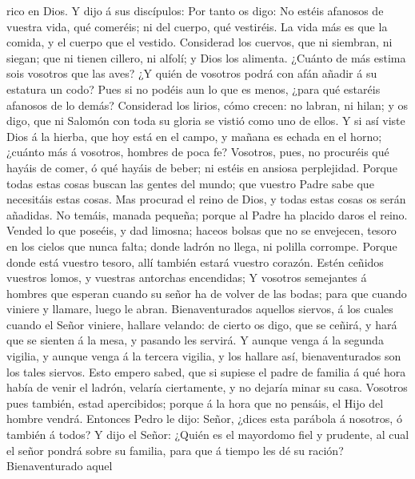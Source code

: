 rico en Dios.  Y dijo á sus discípulos: Por tanto os digo:
No estéis afanosos de vuestra vida, qué comeréis; ni del cuerpo, qué
vestiréis.  La vida más es que la comida, y el cuerpo que
el vestido.  Considerad los cuervos, que ni siembran, ni
siegan; que ni tienen cillero, ni alfolí; y Dios los alimenta. ¿Cuánto
de más estima sois vosotros que las aves?  ¿Y quién de
vosotros podrá con afán añadir á su estatura un codo?  Pues
si no podéis aun lo que es menos, ¿para qué estaréis afanosos de lo
demás?  Considerad los lirios, cómo crecen: no labran, ni
hilan; y os digo, que ni Salomón con toda su gloria se vistió como uno
de ellos.  Y si así viste Dios á la hierba, que hoy está en
el campo, y mañana es echada en el horno; ¿cuánto más á vosotros,
hombres de poca fe?  Vosotros, pues, no procuréis qué
hayáis de comer, ó qué hayáis de beber; ni estéis en ansiosa
perplejidad.  Porque todas estas cosas buscan las gentes
del mundo; que vuestro Padre sabe que necesitáis estas cosas.
 Mas procurad el reino de Dios, y todas estas cosas os
serán añadidas.  No temáis, manada pequeña; porque al Padre
ha placido daros el reino.  Vended lo que poseéis, y dad
limosna; haceos bolsas que no se envejecen, tesoro en los cielos que
nunca falta; donde ladrón no llega, ni polilla corrompe. 
Porque donde está vuestro tesoro, allí también estará vuestro corazón.
 Estén ceñidos vuestros lomos, y vuestras antorchas
encendidas;  Y vosotros semejantes á hombres que esperan
cuando su señor ha de volver de las bodas; para que cuando viniere y
llamare, luego le abran.  Bienaventurados aquellos siervos,
á los cuales cuando el Señor viniere, hallare velando: de cierto os
digo, que se ceñirá, y hará que se sienten á la mesa, y pasando les
servirá.  Y aunque venga á la segunda vigilia, y aunque
venga á la tercera vigilia, y los hallare así, bienaventurados son los
tales siervos.  Esto empero sabed, que si supiese el padre
de familia á qué hora había de venir el ladrón, velaría ciertamente, y
no dejaría minar su casa.  Vosotros pues también, estad
apercibidos; porque á la hora que no pensáis, el Hijo del hombre vendrá.
 Entonces Pedro le dijo: Señor, ¿dices esta parábola á
nosotros, ó también á todos?  Y dijo el Señor: ¿Quién es el
mayordomo fiel y prudente, al cual el señor pondrá sobre su familia,
para que á tiempo les dé su ración?  Bienaventurado aquel
